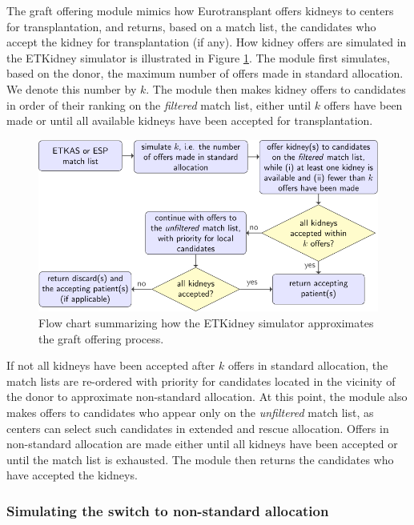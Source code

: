 \documentclass[11pt,twoside,]{book}
\begin{document}
The graft offering module mimics how Eurotransplant offers kidneys to
centers for transplantation, and returns, based on a match list, the
candidates who accept the kidney for transplantation (if any). How kidney
offers are simulated in the ETKidney simulator is illustrated in Figure
\ref{fig:ch8fig3}. The module first simulates, based on the donor, the
maximum number of offers made in standard allocation. We denote this number by \(k\). The module then makes kidney offers to
candidates in order of their ranking on the \emph{filtered} match list,
either until \(k\) offers have been made or until all available kidneys
have been accepted for transplantation.

\begin{figure}[ht]

{\centering \includegraphics[width=0.9\linewidth]{figures/ch8//fig3-graft_offering_diagram} 

}

\caption{Flow chart summarizing how the ETKidney simulator approximates the graft offering process.}\label{fig:ch8fig3}
\end{figure}

If not all kidneys have been accepted after \(k\) offers in standard
allocation, the match lists are re-ordered with priority for
candidates located in the vicinity of the donor to
approximate non-standard allocation. At this point, the module also makes
offers to candidates who appear only on the \emph{unfiltered} match list,
as centers can select such candidates in extended and rescue allocation.
Offers in non-standard allocation are made either until all kidneys have been accepted
or until the match list is exhausted. The module then returns the candidates who have
accepted the kidneys.

\subsubsection{Simulating the switch to non-standard allocation}\label{sec:etkidneynonstandard}
\end{document}
